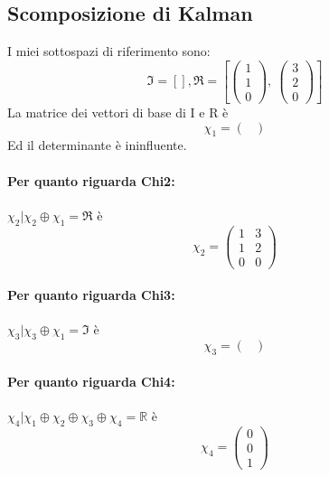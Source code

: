 \documentclass{article}
\begin{document}
\subsection{Scomposizione di Kalman}
I miei sottospazi di riferimento sono:	\[ \mathfrak{I} = \left[ \right], \mathfrak{R} = \left[ \left(\begin{matrix}1\\1\\0\end{matrix}\right), \  \left(\begin{matrix}3\\2\\0\end{matrix}\right)\right] \]
La matrice dei vettori di base di I e R è \[ \chi_1 =  \left(\begin{matrix}\end{matrix}\right) \]Ed il determinante è ininfluente.
\paragraph{Per quanto riguarda Chi2:} $ \chi_2 | \chi_2 \oplus \chi_1 = \mathfrak{R} $ è \[ \chi_2 = \left(\begin{matrix}1 & 3\\1 & 2\\0 & 0\end{matrix}\right) \]

\paragraph{Per quanto riguarda Chi3:} $ \chi_3 | \chi_3 \oplus \chi_1 = \mathfrak{I} $ è \[ \chi_3 = \left(\begin{matrix}\end{matrix}\right) \]

\paragraph{Per quanto riguarda Chi4:} $ \chi_4 | \chi_1 \oplus \chi_2 \oplus  \chi_3 \oplus \chi_4 = \mathbb{R} $ è \[ \chi_4 = \left(\begin{matrix}0\\0\\1\end{matrix}\right) \]
\end{document}
